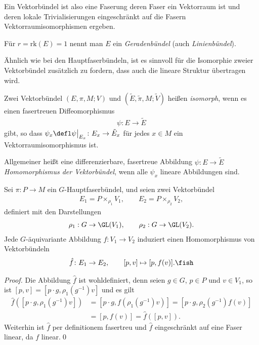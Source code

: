 \documentclass[%
	paper=a5,%
	fleqn,%
	DIV=18,%
	BCOR=0mm,
	fontsize=11pt,
	titlepage=false,%
	bibliography=totoc,
	DIV=18,%
	twoside=true,
	pdftitle=Riemannsche Geometrie,
	pdfauthor=Uwe Semmelmann,
	numbers=noendperiod]%
	{scrbook}
\begin{document}
Ein Vektorbündel ist also eine Faserung deren Faser ein Vektorraum ist und
deren lokale Trivialisierungen eingeschränkt auf die Fasern
Vektorraumisomorphismen ergeben.

\begin{rem}[Bezeichnung.]
Für $r = \mathrm{rk}(E) = 1$ nennt man $E$ ein \emph{Geradenbündel} (auch
\emph{Linienbündel}).\map
\end{rem}


Ähnlich wie bei den Hauptfaserbündeln, ist es sinnvoll für die Isomorphie zweier
Vektorbündel zusätzlich zu fordern, dass auch die lineare Struktur übertragen
wird.

\begin{defn}
Zwei Vektorbündel $(E,\pi,M;V)$ und $(\tilde{E},\tilde{\pi},M;\tilde V)$ heißen
\emph{isomorph}, wenn es einen fasertreuen Diffeomorphismus
\begin{align*}
\psi\colon E\to \tilde{E}
\end{align*}
gibt, so dass $\psi_x \defl \psi\big|_{E_x} \colon E_x\to \tilde{E}_x$ für jedes
$x\in M$ ein Vektorraumisomorphismus ist.

Allgemeiner heißt eine differenzierbare, fasertreue Abbildung $\psi\colon E\to \tilde{E}$
\emph{Homomorphismus der Vektorbündel}, wenn alle $\psi_x$
lineare Abbildungen sind.\fish
\end{defn}


\begin{lem}
Sei $\pi\colon P\to M$ ein $G$-Hauptfaserbündel, und seien zwei Vektorbündel
\begin{align*}
E_1 = P\times_{\rho_1} V_1,\qquad E_2 = P\times_{\rho_2} V_2, 
\end{align*}
definiert mit den Darstellungen
\begin{align*}
\rho_1 : G\to \GL(V_1),\qquad \rho_2 : G\to \GL(V_2).
\end{align*}
Jede $G$-äquivariante Abbildung $f\colon V_1\to V_2$ induziert
einen Homomorphismus von Vektorbündeln
\begin{align*}
\hat{f}\colon E_1\to E_2,\qquad [p,v] \mapsto [p,f(v)].\fish
\end{align*}
\end{lem}
\begin{proof}
Die Abbildung $\hat{f}$ ist wohldefiniert, denn seien $g\in G$, $p\in P$ und
$v\in V_1$, so ist $[p,v] = [p\cdot g,\rho_1(g^{-1})v]$ und es gilt
\begin{align*}
\hat{f}([p\cdot g,\rho_1(g^{-1})v]) &= 
[p\cdot g,f(\rho_1(g^{-1})v)] = [p\cdot g,\rho_2(g^{-1})f(v)] \\
&= [p,f(v)] = \hat{f}([p,v]).
\end{align*}
Weiterhin ist $\hat{f}$ per definitionem fasertreu und
$\hat{f}$ eingeschränkt auf eine Faser linear, da $f$ linear.\qed
\end{proof}
\end{document}

